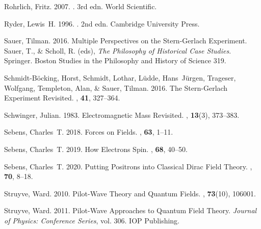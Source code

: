 \documentclass[12pt,secnumarabic,amsmath,amssymb,balancelastpage,nofootinbib]{article}
\begin{document}
\begin{thebibliography}{}
Rohrlich, Fritz. 2007.
. 3rd edn.
\newblock World Scientific.

Ryder, Lewis~H. 1996.
. 2nd edn.
\newblock Cambridge University Press.

Sauer, Tilman. 2016.
\newblock Multiple Perspectives on the Stern-Gerlach Experiment.
 Sauer, T., \& Scholl, R. (eds), {\em The Philosophy of
  Historical Case Studies}.
\newblock Springer.
\newblock Boston Studies in the Philosophy and History of Science 319.

Schmidt-B\"{o}cking, Horst, Schmidt, Lothar, L\"{u}dde, Hans~J\"{u}rgen,
  Trageser, Wolfgang, Templeton, Alan, \& Sauer, Tilman. 2016.
\newblock The Stern-Gerlach Experiment Revisited.
, {\bf 41}, 327--364.

Schwinger, Julian. 1983.
\newblock Electromagnetic Mass Revisited.
, {\bf 13}(3), 373--383.

Sebens, Charles~T. 2018.
\newblock Forces on Fields.
, {\bf 63},
  1--11.

Sebens, Charles~T. 2019.
\newblock How Electrons Spin.
, {\bf 68},
  40--50.

Sebens, Charles~T. 2020.
\newblock Putting Positrons into Classical Dirac Field Theory.
, {\bf 70},
  8--18.

Struyve, Ward. 2010.
\newblock Pilot-Wave Theory and Quantum Fields.
, {\bf 73}(10), 106001.

Struyve, Ward. 2011.
\newblock Pilot-Wave Approaches to Quantum Field Theory.
 {\em Journal of Physics: Conference Series},
  vol. 306.
\newblock IOP Publishing.


\end{thebibliography}
\end{document}
